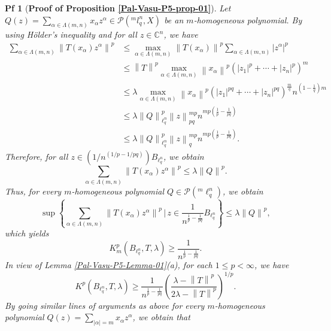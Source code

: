 \documentclass[10pt,a4paper]{amsart}
\newtheorem{pf}{Pf}
\newcommand{\norm}[1]{\left\lVert#1\right\rVert}
\begin{document}
\begin{pf}[{\bf Proof of Proposition \ref{Pal-Vasu-P5-prop-01}}]
	Let $Q(z)=\sum_{\alpha \in\Lambda(m,n)}x_{\alpha}z^{\alpha}\in \mathcal{P}(^ml^n_q,X)$ be an $m$-homogeneous polynomial. By using H\"{o}lder's inequality and for all $z\in \mathbb{C}^n$, we have 
	\begin{align*}
		\sum_{\alpha \in\Lambda(m,n)}\norm{T(x_{\alpha})z^{\alpha}}^p &\leq \max_{\alpha \in\Lambda(m,n)}\norm{T(x_{\alpha})}^p \sum_{\alpha \in\Lambda(m,n)}|z^{\alpha}|^p \\[2mm]& \leq \norm{T}^p \max_{\alpha \in\Lambda(m,n)}\norm{x_{\alpha}}^p \left(|z_1|^p+\cdots+|z_n|^p\right)^m \\[2mm]& 
		\leq \lambda \max_{\alpha \in\Lambda(m,n)}\norm{x_{\alpha}}^p \left(|z_1|^{pq}+\cdots+|z_n|^{pq}\right)^{\frac{m}{q}} n^{(1-\frac{1}{q})m}\\[2mm]& 
		\leq \lambda \norm{Q}^p_{\ell^n_q} \norm{z}^{mp}_{pq}n^{{mp}\left(\frac{1}{p}-\frac{1}{pq}\right)}\\[2mm]&
		\leq \lambda \norm{Q}^p_{\ell^n_q} \norm{z}^{mp}_{q}n^{{mp}\left(\frac{1}{p}-\frac{1}{pq}\right)}.
	\end{align*}
Therefore, for all $z\in \left(1/n^{(1/p-1/pq)}\right)B_{\ell^n_q}$, we obtain
\begin{equation*}
	\sum_{\alpha \in\Lambda(m,n)}\norm{T(x_{\alpha})z^{\alpha}}^p\leq \lambda \norm{Q}^p.
\end{equation*}
Thus, for every $m$-homogeneous polynomial $Q\in \mathcal{P}(^m\ell^n_q)$, we obtain
\begin{equation*}
	\sup \left\{\sum_{\alpha \in\Lambda(m,n)}\norm{T(x_{\alpha})z^{\alpha}}^p \,| \,z\in \frac{1}{n^{\frac{1}{p}-\frac{1}{pq}}}B_{\ell^n_q}\right\}\leq \lambda \norm{Q}^p,
\end{equation*}
which yields 
\begin{equation*}
	K^p_m(B_{\ell^n_q},T,\lambda)\geq \frac{1}{n^{\frac{1}{p}-\frac{1}{pq}}}.
\end{equation*}
In view of Lemma \ref{Pal-Vasu-P5-Lemma-01}(a), for each $1\leq p<\infty$, we have 
\begin{equation*}
	K^p(B_{\ell^n_q},T,\lambda)\geq \frac{1}{n^{\frac{1}{p}-\frac{1}{pq}}} \left(\frac{\lambda-\norm{T}^p}{2\lambda-\norm{T}^p}\right)^{1/p}.
\end{equation*}
By going similar lines of arguments as above for every $m$-homogeneous polynomial $Q(z)=\sum_{|\alpha|=m}x_{\alpha}z^{\alpha}$, we obtain that
\begin{equation*}

\end{equation*}
\end{pf}
\end{document}
